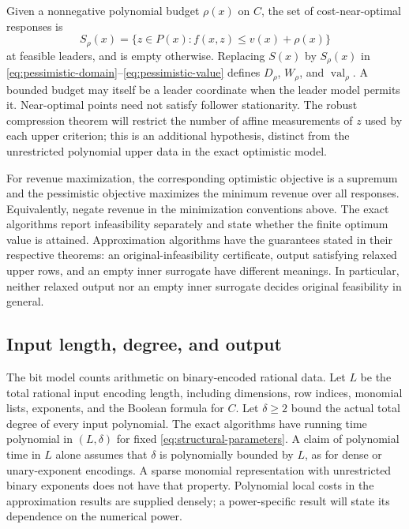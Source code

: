 Given a nonnegative polynomial budget $\rho(x)$ on $C$, the set of
cost-near-optimal responses is
\begin{equation}\label{eq:nearoptimal-set}
 S_\rho(x)=\{z\in P(x):f(x,z)\le v(x)+\rho(x)\}
\end{equation}
at feasible leaders, and is empty otherwise. Replacing $S(x)$ by
$S_\rho(x)$ in \eqref{eq:pessimistic-domain}--\eqref{eq:pessimistic-value}
defines $D_\rho$, $W_\rho$, and $\operatorname{val}_\rho$.
A bounded budget may itself be a leader coordinate when the leader model
permits it. Near-optimal points need not satisfy follower stationarity.
The robust compression theorem will restrict the number of affine
measurements of $z$ used by each upper criterion; this is an additional
hypothesis, distinct from the unrestricted polynomial upper data in the
exact optimistic model.

For revenue maximization, the corresponding optimistic objective is a
supremum and the pessimistic objective maximizes the minimum revenue over
all responses. Equivalently, negate revenue in the minimization
conventions above. The exact algorithms report infeasibility separately
and state whether the finite optimum value is attained. Approximation
algorithms have the guarantees stated in their respective theorems:
an original-infeasibility certificate, output satisfying relaxed upper
rows, and an empty inner surrogate have different meanings. In particular,
neither relaxed output nor an empty inner surrogate decides original
feasibility in general.

\subsection{Input length, degree, and output}\label{subsec:encoding}

The bit model counts arithmetic on binary-encoded rational data. Let $L$
be the total rational input encoding length, including dimensions, row
indices, monomial lists, exponents, and the Boolean formula for $C$.
Let $\delta\ge2$ bound the actual total degree of every input polynomial.
The exact algorithms have running time polynomial in $(L,\delta)$ for
fixed \eqref{eq:structural-parameters}. A claim of polynomial time in $L$
alone assumes that $\delta$ is polynomially bounded by $L$, as for dense
or unary-exponent encodings. A sparse monomial representation with
unrestricted binary exponents does not have that property. Polynomial
local costs in the approximation results are supplied densely; a
power-specific result will state its dependence on the numerical power.


